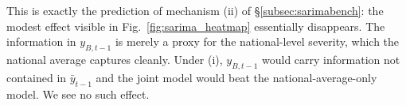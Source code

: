 This is exactly the prediction of mechanism (ii) of
\S\ref{subsec:sarimabench}: the modest effect visible in
Fig.~\ref{fig:sarima_heatmap} essentially disappears. The information
in $y_{B,t-1}$ is merely a proxy for the national-level severity, which
the national average captures cleanly. Under (i), $y_{B,t-1}$ would
carry information not contained in $\bar y_{t-1}$ and the joint model
would beat the national-average-only model. We see no such effect.
